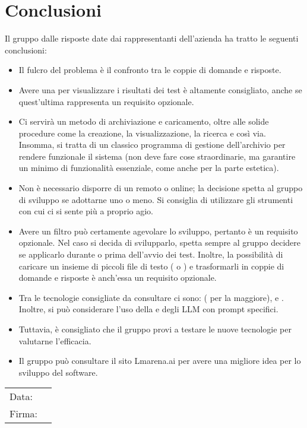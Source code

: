 \documentclass[a4paper, 12pt]{article}
\begin{document}
\section{Conclusioni}
\label{sec:Conclusioni}
Il gruppo dalle risposte date dai rappresentanti dell’azienda ha tratto le seguenti conclusioni:
\begin{itemize}
    \item Il fulcro del problema è il confronto tra le coppie di domande e risposte. 
    \item Avere una  per visualizzare i risultati dei test è altamente consigliato, anche se quest’ultima rappresenta un requisito opzionale.
    \item Ci servirà un metodo di archiviazione e caricamento, oltre alle solide procedure come la creazione, la visualizzazione, la ricerca e così via. Insomma, si tratta di un classico programma di gestione dell’archivio per rendere funzionale il sistema (non deve fare cose straordinarie, ma garantire un minimo di funzionalità essenziale, come anche per la parte estetica).
    \item Non è necessario disporre di un  remoto o online; la decisione spetta al gruppo di sviluppo se adottarne uno o meno. Si consiglia di utilizzare gli strumenti con cui ci si sente più a proprio agio.
    \item Avere un filtro può certamente agevolare lo sviluppo, pertanto è un requisito opzionale. Nel caso si decida di svilupparlo, spetta sempre al gruppo decidere se applicarlo durante o prima dell'avvio dei test. Inoltre, la possibilità di caricare un insieme di piccoli file di testo ( o ) e trasformarli in coppie di domande e risposte è anch'essa un requisito opzionale.
    \item Tra le tecnologie consigliate da consultare ci sono:  ( per la maggiore),  e . Inoltre, si può considerare l'uso della  e degli LLM con prompt specifici. 
    \item Tuttavia, è consigliato che il gruppo provi a testare le nuove tecnologie per valutarne l'efficacia.
    \item Il gruppo può consultare il sito Lmarena.ai per avere una migliore idea per lo sviluppo del software.
\end{itemize}
\vfill
{\renewcommand{\arraystretch}{2}
\begin{tabular}{l p{5cm}}
    Data: &  \hrulefill \\
    Firma: & \hrulefill \\
\end{tabular}
}
\end{document}
